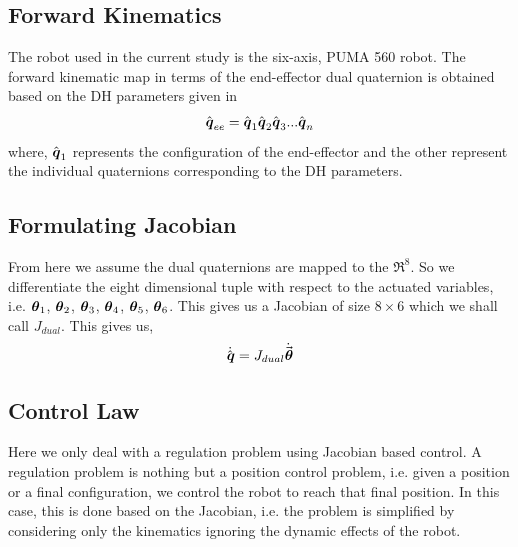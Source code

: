 \documentclass[a4paper,12pt]{article}
\begin{document}
\subsection{Forward Kinematics}
The robot used in the current study is the six-axis, PUMA 560 robot. The forward kinematic map in terms of the end-effector dual quaternion is obtained based on the DH parameters given in \cite{ghosal2006robotics}
\begin{align}
	\hat{\boldsymbol{q}}_{ee} = \hat{\boldsymbol{q}}_1\hat{\boldsymbol{q}}_2\hat{\boldsymbol{q}}_3...\hat{\boldsymbol{q}}_n
\end{align}
where, $\hat{\boldsymbol{q}}_1$ represents the configuration of the end-effector and the other represent the individual quaternions corresponding to the DH parameters. 
\subsection{Formulating Jacobian}
From here we assume the dual quaternions are mapped to the $\Re^8$. So we differentiate the eight dimensional tuple with respect to the actuated variables, i.e. $\boldsymbol{\theta}_1$, $\boldsymbol{\theta}_2$, $\boldsymbol{\theta}_3$, $\boldsymbol{\theta}_4$, $\boldsymbol{\theta}_5$, $\boldsymbol{\theta}_6$. This gives us a Jacobian of size $8\times6$ which we shall call $J_{dual}$. This gives us,
\begin{align}
	\dot{\hat{\boldsymbol{q}}} = J_{dual} \dot{\vec{\boldsymbol{\theta}}} \label{eqJ}
\end{align}
\subsection{Control Law} \label{controllaw}
Here we only deal with a regulation problem using Jacobian based control. A regulation problem is nothing but a position control problem, i.e. given a position or a final configuration, we control the robot to reach that final position. In this case, this is done based on the Jacobian, i.e. the problem is simplified by considering only the kinematics ignoring the dynamic effects of the robot.
\end{document}

